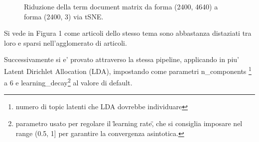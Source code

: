 \documentclass[runningheads]{llncs}
\begin{document}
\begin{figure}%
    \centering
    \qquad
    \caption{Riduzione della term document matrix da forma (2400, 4640) a forma (2400, 3) via tSNE. }%
    \label{fig:tsne1}%
\end{figure} 

Si vede in Figura 1 come articoli dello stesso tema sono abbastanza distaziati tra loro e sparsi nell'agglomerato di 
articoli.\par

\qquad
\qquad



Successivamente si e' provato attraverso la stessa pipeline, applicando in piu' Latent Dirichlet Allocation (LDA), impostando come parametri n\_components \footnote{numero di topic latenti che LDA dovrebbe individuare} a 6 e learning\_decay\footnote{parametro usato per regolare il \"learning rate\", che si consiglia imposare nel range (0.5, 1] per garantire la convergenza asintotica.} al valore di default.



\end{document}
